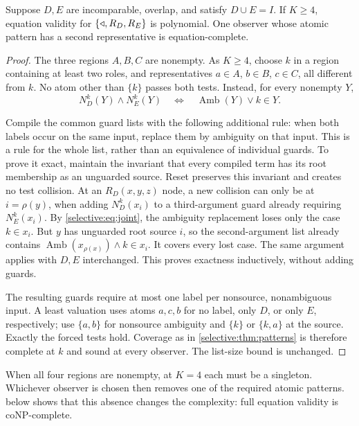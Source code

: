 \begin{theorem}\label{selective:thm:covering}
Suppose $D,E$ are incomparable, overlap, and satisfy $D\cup E=I$.
If $K\geq4$, equation validity for $\{\mathbin{\triangleleft},R_D,R_E\}$ is polynomial.
One observer whose atomic pattern has a second representative is
equation-complete.
\end{theorem}
\begin{proof}
The three regions $A,B,C$ are nonempty. As $K\geq4$, choose $k$
in a region containing at least two roles, and representatives
$a\in A$, $b\in B$, $c\in C$, all different from $k$.
No atom other than $\{k\}$ passes both tests. Instead,
for every nonempty $Y$,
\begin{equation}\label{selective:eq:joint}
 N_D^k(Y)\land N_E^k(Y)\quad\Longleftrightarrow\quad
 \operatorname{Amb}(Y)\lor k\in Y.
\end{equation}

Compile the common guard lists with the following additional rule:
when both labels occur on the same input, replace them by ambiguity
on that input. This is a rule for the whole list, rather than an
equivalence of individual guards. To prove it exact, maintain the
invariant that every compiled term has its root membership as an
unguarded source. Reset preserves this invariant and creates no
test collision. At an $R_D(x,y,z)$ node, a new collision can only be
at $i=\rho(y)$, when adding $N_D^k(x_i)$ to a third-argument guard
already requiring $N_E^k(x_i)$. By \eqref{selective:eq:joint}, the
ambiguity replacement loses only the case $k\in x_i$. But $y$ has
unguarded root source $i$, so the second-argument list already
contains $\operatorname{Amb}(x_{\rho(x)})\land k\in x_i$.
It covers every lost case. The same argument applies with $D,E$
interchanged. This proves exactness inductively, without adding guards.

The resulting guards require at most one label per nonsource,
nonambiguous input. A least valuation uses atoms $a,c,b$ for no
label, only $D$, or only $E$, respectively; use $\{a,b\}$ for
nonsource ambiguity and $\{k\}$ or $\{k,a\}$ at the source.
Exactly the forced tests hold. Coverage as in
\cref{selective:thm:patterns} is therefore complete at $k$ and
sound at every observer. The list-size bound is unchanged.
\end{proof}

When all four regions are nonempty, at $K=4$ each must be a singleton.
Whichever observer is chosen then removes one of the required atomic patterns.
 below shows that this absence changes
the complexity: full equation validity is coNP-complete.

